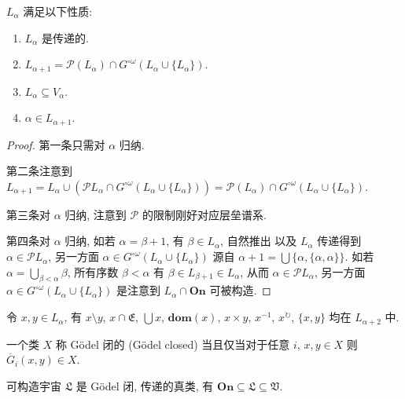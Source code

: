 \begin{lemma}
    \(L_\alpha\) 满足以下性质:
    \begin{enumerate}
        \item \(L_\alpha\) 是传递的.
        \item \(L_{\alpha + 1} = \mathcal{P}(L_\alpha) \cap G^{\circ \omega} (L_\alpha \cup \{L_\alpha\})\).
        \item \(L_\alpha \subseteq V_\alpha\).
        \item \(\alpha \in L_{\alpha + 1}\).
    \end{enumerate}

    \begin{proof}
        第一条只需对 \(\alpha\) 归纳.

        第二条注意到 \(L_{\alpha + 1} = L_\alpha \cup (\mathcal{P} L_\alpha \cap G^{\circ \omega} (L_\alpha \cup \{L_\alpha\})) = \mathcal{P}(L_\alpha) \cap G^{\circ \omega} (L_\alpha \cup \{L_\alpha\})\).

        第三条对 \(\alpha\) 归纳, 注意到 \(\mathcal{P}\) 的限制刚好对应层垒谱系.

        第四条对 \(\alpha\) 归纳, 如若 \(\alpha = \beta + 1\), 有 \(\beta \in L_\alpha\), 自然推出
        以及 \(L_\alpha\) 传递得到 \(\alpha \in \mathcal{P} L_\alpha\), 另一方面 \(\alpha \in G^{\circ \omega} (L_\alpha \cup \{L_\alpha\})\) 源自
        \(\alpha + 1 = \bigcup \{\alpha, \{\alpha, \alpha\}\}\).
        如若 \(\alpha = \bigcup_{\beta < \alpha} \beta\), 所有序数 \(\beta < \alpha\) 有 \(\beta \in L_{\beta + 1} \in L_\alpha\),
        从而 \(\alpha \in \mathcal{P} L_\alpha\), 另一方面 \(\alpha \in G^{\circ \omega} (L_\alpha \cup \{L_\alpha\})\) 是注意到 \(L_\alpha \cap \mathbf{On}\) 可被构造.
    \end{proof}
\end{lemma}

\begin{lemma}
    令 \(x,y \in L_\alpha\), 有 \(x \setminus y\), \(x \cap \mathfrak{E}\), 
    \(\bigcup x\), \(\mathbf{dom} (x)\), \(x \times y\), \(x^{-1}\), \(x^{\circlearrowright}\), \(\{x,y\}\) 均在 \(L_{\alpha + 2}\) 中.
\end{lemma}

\begin{definition}
    一个类 \(X\) 称 Gödel 闭的 (Gödel closed) 当且仅当对于任意 \(i\), \(x,y \in X\) 则 \(\ddot{G_i} (x,y) \in X\).
\end{definition}

\begin{theorem}
    可构造宇宙 \(\mathfrak{L}\) 是 Gödel 闭, 传递的真类, 有 \(\mathbf{On} \subseteq \mathfrak{L} \subseteq \mathfrak{V}\).
\end{theorem}

